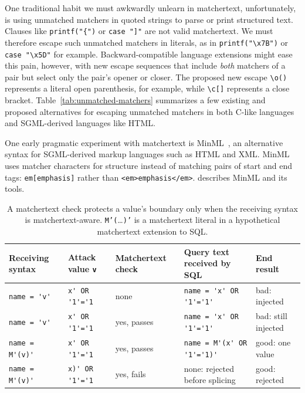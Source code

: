 One traditional habit we must awkwardly unlearn in matchertext,
unfortunately,
is using unmatched matchers in quoted strings
to parse or print structured text.
Clauses like \verb|printf("{")| or \verb|case "]"|
are not valid matchertext.
We must therefore escape such unmatched matchers in literals,
as in \verb|printf("\x7B")| or \verb|case "\x5D"| for example.
Backward-compatible language extensions might ease this pain,
however, 
with new escape sequences that include \emph{both} matchers of a pair
but select only the pair's opener or closer.
The proposed new escape \verb|\o()| represents a literal open parenthesis,
for example,
while \verb|\c[]| represents a close bracket.
Table~\ref{tab:unmatched-matchers} summarizes a few existing and proposed
alternatives for escaping unmatched matchers
in both C-like languages and SGML-derived languages like HTML.

One early pragmatic experiment with matchertext
is MinML~,
an alternative syntax
for SGML-derived markup languages such as HTML and XML.
MinML uses matcher characters for structure
instead of matching pairs of start and end tags:
\eg \verb|em[emphasis]| rather than \verb|<em>emphasis</em>|.
 describes MinML and its tools.

\begin{table}[t]
\begin{center}
\begin{footnotesize}
\setlength{\tabcolsep}{4pt}
\begin{tabular}{lllll}
\hline
Receiving syntax & Attack value \verb|v| & Matchertext check & Query text received by SQL & End result \\
\hline
\verb|name = '|\verb|v|\verb|'|
	& \verb|x' OR '1'='1| & none
	& \verb|name = 'x' OR '1'='1'| & bad: injected \\
\verb|name = '|\verb|v|\verb|'|
	& \verb|x' OR '1'='1| & yes, passes
	& \verb|name = 'x' OR '1'='1'| & bad: still injected \\
\verb|name = M'(|\verb|v|\verb|)'|
	& \verb|x' OR '1'='1| & yes, passes
	& \verb|name = M'(x' OR '1'='1)'| & good: one value \\
\verb|name = M'(|\verb|v|\verb|)'|
	& \verb|x)' OR '1'='1| & yes, fails
	& none: rejected before splicing & good: rejected \\
\hline
\end{tabular}
\end{footnotesize}
\end{center}
\caption{A matchertext check protects a value's boundary
	only when the receiving syntax is matchertext-aware.
	\texttt{M'(}\dots\texttt{)'} is a matchertext literal
	in a hypothetical matchertext extension to SQL.}
\label{tab:intro:sql}
\end{table}

